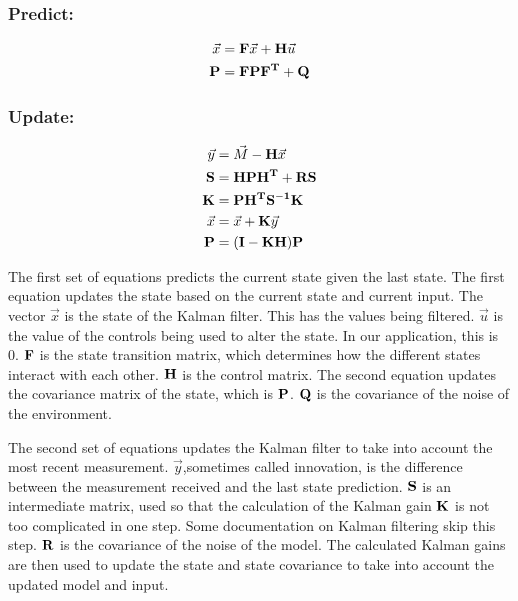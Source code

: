 \subsubsection*{Predict:}
\begin{align}
    \vec{x} &= \mathbf{F}\vec{x} + \mathbf{H}\vec{u} \\
    \mathbf{P} &= \mathbf{F}\mathbf{P}\mathbf{F^T} + \mathbf{Q} 
\end{align}
\subsubsection*{Update:}
\begin{align}
    \vec{y} &= \vec{M} - \mathbf{H}\vec{x} \\
    \mathbf{S}&= \mathbf{HPH^T+RS} \\
    \mathbf{K} &= \mathbf{PH^TS^{-1}K} \\
    \vec{x} &= \vec{x} + \mathbf{K}\vec{y} \\
    \mathbf{P} &= \mathbf{(I-KH)P}
\end{align} \par

The first set of equations predicts the current state given the last state. The first equation updates the state based on the current state and current input. The vector $\vec{x}$ is the state of the Kalman filter. This has the values being filtered. $\vec{u}$ is the value of the controls being used to alter the state. In our application, this is 0. $\mathbf{F}$ is the state transition matrix, which determines how the different states interact with each other.  $\mathbf{H}$ is the control matrix. The second equation updates the covariance matrix of the state, which is $\mathbf{P}$. $\mathbf{Q}$ is the covariance of the noise of the environment. \par

The second set of equations updates the Kalman filter to take into account the most recent measurement. $\vec{y}$,sometimes called innovation, is the difference between the measurement received and the last state prediction. 
$\mathbf{S}$ is an intermediate matrix, used so that the calculation of the Kalman gain $\mathbf{K}$ is not too complicated in one step. Some documentation on Kalman filtering skip this step.  $\mathbf{R}$ is the covariance of the noise of the model. The calculated Kalman gains are then used to update the state and state covariance to take into account the updated model and input. \par

